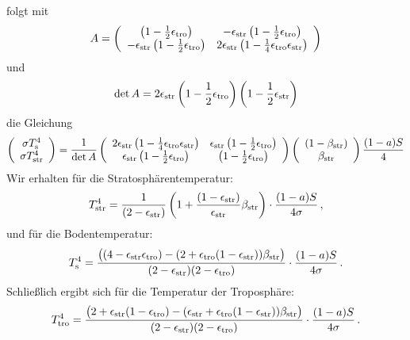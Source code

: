 folgt mit
\begin{equation}
    A =  \left( \begin{array}{cc}  \left( 1 - \frac{1}{2} \epsilon_{\rm tro} \right) &  
                  - \epsilon_{\rm str} \left(1- \frac{1}{2} \epsilon_{\rm tro} \right) \\
     - \epsilon_{\rm str} \left( 1 - \frac{1}{2} \epsilon_{\rm tro} \right)  & 
                       2 \epsilon_{\rm str} \left( 1 - \frac{1}{4} \epsilon_{\rm tro} \epsilon_{\rm str} \right)
     \end{array} \right)
\end{equation}
und
\begin{equation}
    {\rm det\,}A =    2  \epsilon_{\rm str}  
    \left( 1 - \frac{1}{2} \epsilon_{\rm tro} \right) \left( 1 - \frac{1}{2} \epsilon_{\rm str} \right)
\end{equation}
die Gleichung
\begin{equation}
    \left( \begin{array}{c}  \sigma T_{\rm s}^4 \\
       \sigma T_{\rm str}^4 \end{array} \right) = 
       \frac{1}{ {\rm det\,}A}
    \left( \begin{array}{cc} 
                         2 \epsilon_{\rm str} \left( 1 - \frac{1}{4} \epsilon_{\rm tro} \epsilon_{\rm str} \right) &
                   \epsilon_{\rm str} \left(1- \frac{1}{2} \epsilon_{\rm tro} \right) \\
      \epsilon_{\rm str} \left( 1 - \frac{1}{2} \epsilon_{\rm tro} \right)  &      \left( 1 - \frac{1}{2} \epsilon_{\rm tro} \right) 
     \end{array} \right) 
      \left( \begin{array}{c} (1-\beta_{\rm str})  \\ 
             \beta_{\rm str}  \end{array} \right) \frac{(1-a)S}{4}
\end{equation}
Wir erhalten f\"ur die Stratosph\"arentemperatur:
\begin{equation}
\label{eq_Tstr}
    T_{\rm str}^4  = 
   \frac{1}{(2-\epsilon_{\rm str})} \left( 1 + \frac{(1-\epsilon_{\rm str})}{\epsilon_{\rm str}} \beta_{\rm str} \right)  
           \cdot   \frac{(1-a)S}{4\sigma}          \, ,         
\end{equation}
und f\"ur die Bodentemperatur:
\begin{equation}
\label{eq_Ts}
    T_{\rm s}^4  = 
   \frac{\big( (4-\epsilon_{\rm str} \epsilon_{\rm tro})
    -  (2+ \epsilon_{\rm tro} (1-\epsilon_{\rm str})) \beta_{\rm str} \big)}{(2-\epsilon_{\rm str})(2-\epsilon_{\rm tro})} 
          \cdot    \frac{(1-a)S}{4\sigma}          \, .        
\end{equation}
Schlie\ss lich ergibt sich f\"ur die Temperatur der Troposph\"are:
\begin{equation}
\label{eq_Ttro}
    T_{\rm tro}^4  = 
   \frac{   \big( 2+ \epsilon_{\rm str}(1-\epsilon_{\rm tro})  -  ( \epsilon_{\rm str}+ 
          \epsilon_{\rm tro} (1-\epsilon_{\rm str})) \beta_{\rm str} \big)  }{(2-\epsilon_{\rm str})(2-\epsilon_{\rm tro})} 
          \cdot    \frac{(1-a)S}{4\sigma}          \, .        
\end{equation}


